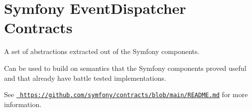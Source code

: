\chapter{Symfony Event\+Dispatcher Contracts}
\hypertarget{md_vendor_2symfony_2event-dispatcher-contracts_2_r_e_a_d_m_e}{}\label{md_vendor_2symfony_2event-dispatcher-contracts_2_r_e_a_d_m_e}
A set of abstractions extracted out of the Symfony components.

Can be used to build on semantics that the Symfony components proved useful and that already have battle tested implementations.

See \href{https://github.com/symfony/contracts/blob/main/README.md}{\texttt{ https\+://github.\+com/symfony/contracts/blob/main/\+README.\+md}} for more information. 